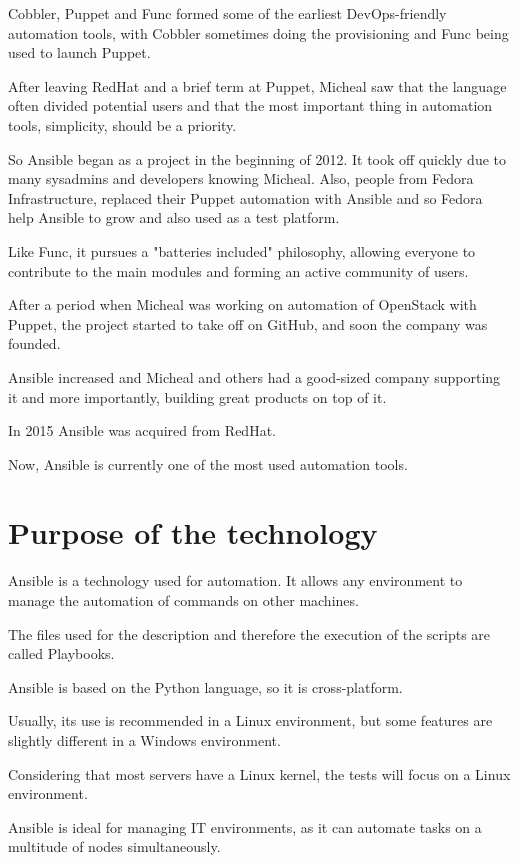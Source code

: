 \documentclass[12pt,a4paper,openright,twoside]{book}
\begin{document}
Cobbler, Puppet and Func formed some of the earliest DevOps-friendly automation tools, with Cobbler sometimes doing the provisioning and Func being used to launch Puppet.


After leaving RedHat and a brief term at Puppet, Micheal saw that the language often divided potential users and that the most important thing in automation tools, simplicity, should be a priority.


So Ansible began as a project in the beginning of 2012. It took off quickly due to many sysadmins and developers knowing Micheal.
Also, people from Fedora Infrastructure, replaced their Puppet automation with Ansible and so Fedora help Ansible to grow and also used as a test platform.


Like Func, it pursues a "batteries included" philosophy, allowing everyone to contribute to the main modules and forming an active community of users.


After a period when Micheal was working on automation of OpenStack with Puppet, the project started to take off on GitHub, and soon the company was founded.


Ansible increased and Micheal and others had a good-sized company supporting it and more importantly, building great products on top of it.


In 2015 Ansible was acquired from RedHat\cite{ansibleRedHat}.


Now, Ansible is currently one of the most used automation tools.

\section{Purpose of the technology}
Ansible is a technology used for automation. It allows any environment to manage the automation of commands on other machines.


The files used for the description and therefore the execution of the scripts are called Playbooks.


Ansible is based on the Python language, so it is cross-platform.


Usually, its use is recommended in a Linux environment, but some features are slightly different in a Windows environment.


Considering that most servers have a Linux kernel, the tests will focus on a Linux environment.


Ansible is ideal for managing IT environments, as it can automate tasks on a multitude of nodes simultaneously.
\end{document}
